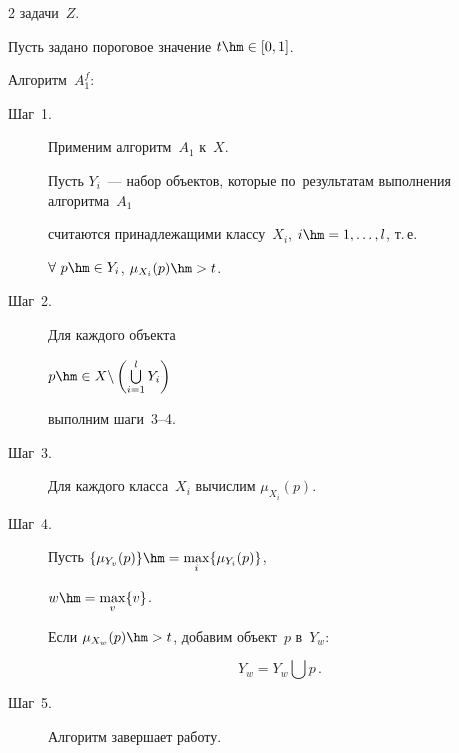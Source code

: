 \begin{multicols}{2}
задачи~$Z$.


Пусть задано пороговое значение $t \hm\in [0,1]$.





\smallskip





Алгоритм~$ A_{1}^{f} $:


\begin{description}


\item[Шаг~1.] Применим алгоритм~$A_{1} $ к~$ X $.


Пусть $Y_{i} $~--- набор объектов, которые по~результатам выполнения алгоритма~$A_{1}$ 


считаются принадлежащими классу~$X_{i}$, $i\hm=1,\ldots,l $, т.\,е.\


 $\forall\ p \hm\in Y_{i}$, $\mu_{X_{i}}(p)\hm>t$.





\item[Шаг~2.] Для каждого объекта


 $ p\hm \in X \backslash \left(\bigcup\limits_{i=1}^{l} Y_{i}\right)$


выполним шаги~3--4.





\item[Шаг~3.] Для каждого класса~$X_{i}$ вычислим $\mu_{X_{i}}(p)$.





\item[Шаг~4.] Пусть $\{\mu_{Y_{v}}(p) \} \hm= \max\limits_{i} \{ \mu_{Y_{i}}(p) \}$,


 $w\hm = \max\limits_{v} \{v\}$.


Если $\mu_{X_{w}}(p) \hm> t$, добавим объект~$p$ в~$Y_{w}$:


$$ 


Y_{w} = Y_{w} \bigcup p\,. 


$$





\item[Шаг~5.] Алгоритм завершает работу.





\end{description}






\end{multicols}
